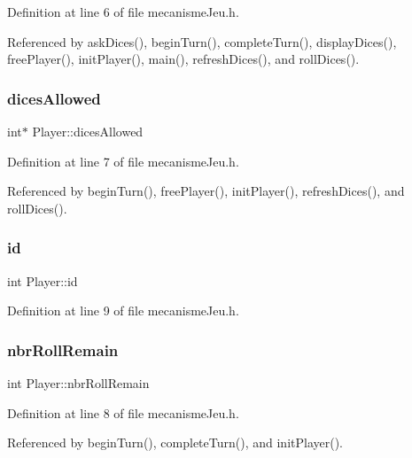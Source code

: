 Definition at line 6 of file mecanisme\+Jeu.\+h.



Referenced by ask\+Dices(), begin\+Turn(), complete\+Turn(), display\+Dices(), free\+Player(), init\+Player(), main(), refresh\+Dices(), and roll\+Dices().

\mbox{\label{structPlayer_adb33524b9364f3e0bcfc5bd098cdaaf0}} 
\subsubsection{\texorpdfstring{dices\+Allowed}{dicesAllowed}}
{\footnotesize\ttfamily int$\ast$ Player\+::dices\+Allowed}



Definition at line 7 of file mecanisme\+Jeu.\+h.



Referenced by begin\+Turn(), free\+Player(), init\+Player(), refresh\+Dices(), and roll\+Dices().

\mbox{\label{structPlayer_a05e05f3a23de78da7ec032ec2bcf8c6c}} 
\subsubsection{\texorpdfstring{id}{id}}
{\footnotesize\ttfamily int Player\+::id}



Definition at line 9 of file mecanisme\+Jeu.\+h.

\mbox{\label{structPlayer_ae4c871b61a2af583a8b5975d736bea5d}} 
\subsubsection{\texorpdfstring{nbr\+Roll\+Remain}{nbrRollRemain}}
{\footnotesize\ttfamily int Player\+::nbr\+Roll\+Remain}



Definition at line 8 of file mecanisme\+Jeu.\+h.



Referenced by begin\+Turn(), complete\+Turn(), and init\+Player().

